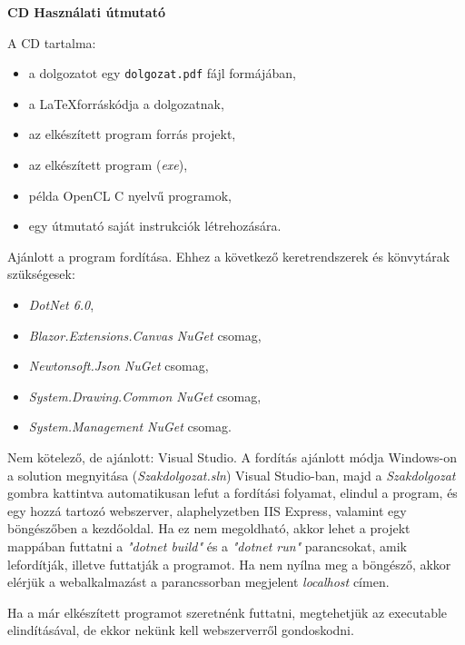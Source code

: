\pagestyle{empty}

\noindent \textbf{\Large CD Használati útmutató}

\vskip 1cm

A CD tartalma:
\begin{itemize}
\item a dolgozatot egy \texttt{dolgozat.pdf} fájl formájában,
\item a \LaTeX\enskip forráskódja a dolgozatnak,
\item az elkészített program forrás projekt,
\item az elkészített program (\textit{exe}),
\item példa OpenCL C nyelvű programok,
\item egy útmutató saját instrukciók létrehozására.
\end{itemize}

Ajánlott a program fordítása. Ehhez a következő keretrendszerek és könvytárak szükségesek: 
\begin{itemize}
\item \textit{DotNet 6.0},
\item \textit{Blazor.Extensions.Canvas NuGet} csomag,
\item \textit{Newtonsoft.Json NuGet} csomag,
\item \textit{System.Drawing.Common NuGet} csomag,
\item \textit{System.Management  NuGet} csomag.
\end{itemize}

Nem kötelező, de ajánlott: Visual Studio.
A fordítás ajánlott módja Windows-on a solution megnyitása (\textit{Szakdolgozat.sln}) Visual Studio-ban, majd a \textit{Szakdolgozat} gombra kattintva automatikusan lefut a fordítási folyamat, elindul a program, és egy hozzá tartozó webszerver, alaphelyzetben IIS Express, valamint egy böngészőben a kezdőoldal.
Ha ez nem megoldható, akkor lehet a projekt mappában futtatni a \textit{"dotnet build"} és a \textit{"dotnet run"} parancsokat, amik lefordítják, illetve futtatják a programot. Ha nem nyílna meg a böngésző, akkor elérjük a webalkalmazást a parancssorban megjelent \textit{localhost} címen.

Ha a már elkészített programot szeretnénk futtatni, megtehetjük az executable elindításával, de ekkor nekünk kell webszerverről gondoskodni.

